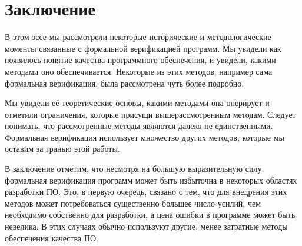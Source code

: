 \section{Заключение}

В этом эссе мы рассмотрели некоторые исторические и методологические моменты связанные с формальной верификацией программ. Мы увидели как появилось понятие качества программного обеспечения, и увидели, какими методами оно обеспечивается. Некоторые из этих методов, например сама формальная верификация, была рассмотрена чуть более подробно.

Мы увидели её теоретические основы, какими методами она оперирует и отметили ограничения, которые присущи вышерассмотренным методам. Следует понимать, что рассмотренные методы являются далеко не единственными. Формальная верификация использует множество других методов, которые мы оставим за гранью этой работы.

В заключение отметим, что несмотря на большую выразительную силу, формальная верификация программ может быть избыточна в некоторых областях разработки ПО. Это, в первую очередь, связано с тем, что для внедрения этих методов может потребоваться существенно большее число усилий, чем необходимо собственно для разработки, а цена ошибки в программе может быть невелика. В этих случаях обычно используют другие, менее затратные методы обеспечения качества ПО.
